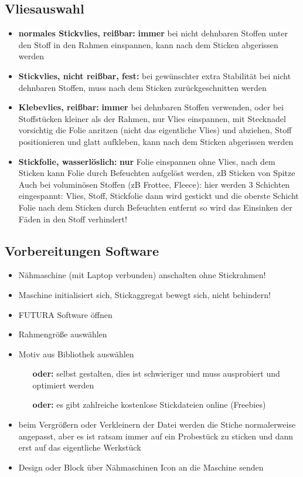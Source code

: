 \documentclass{\basedir/fablab-document}
\begin{document}
\subsection{Vliesauswahl}
\begin{itemize}
 \item \textbf{normales Stickvlies, reißbar:} \textbf{immer} bei nicht dehnbaren Stoffen unter den Stoff in den Rahmen einspannen, kann nach dem Sticken abgerissen werden
 \item \textbf{Stickvlies, nicht reißbar, fest:} bei gewünschter extra Stabilität bei nicht dehnbaren Stoffen, muss nach dem Sticken zurückgeschnitten werden
 \item \textbf{Klebevlies, reißbar:} \textbf{immer} bei dehnbaren Stoffen verwenden, oder bei Stoffstücken kleiner als der Rahmen, nur Vlies einspannen, mit Stecknadel vorsichtig die Folie anritzen (nicht das eigentliche Vlies) und abziehen, Stoff positionieren und glatt aufkleben, kann nach dem Sticken abgerissen werden
 \item \textbf{Stickfolie, wasserlöslich:} \textbf{nur} Folie einspannen ohne Vlies, nach dem Sticken kann Folie durch Befeuchten aufgelöst werden, zB Sticken von Spitze
Auch bei voluminösen Stoffen (zB Frottee, Fleece): hier werden 3 Schichten eingespannt: Vlies, Stoff, Stickfolie dann wird gestickt und die oberste Schicht Folie nach dem Sticken durch Befeuchten entfernt
so wird das Einsinken der Fäden in den Stoff verhindert!
\end{itemize}

\subsection{Vorbereitungen Software}
\begin{itemize}
 \item Nähmaschine (mit Laptop verbunden) anschalten ohne Stickrahmen!
 \item Maschine initialisiert sich, Stickaggregat bewegt sich, nicht behindern!
 \item FUTURA Software öffnen
 \item Rahmengröße auswählen
 \item Motiv aus Bibliothek auswählen
 \begin{itemize}
	\item[\textbf{oder:}] selbst gestalten, dies ist schwieriger und muss ausprobiert und optimiert 
werden
	\item[\textbf{oder:}] es gibt zahlreiche kostenlose Stickdateien online (Freebies)
 \end{itemize}
 \item beim Vergrößern oder Verkleinern der Datei werden die Stiche normalerweise angepasst, aber es ist ratsam immer auf ein Probestück zu sticken und dann erst auf das eigentliche Werkstück
 \item Design oder Block über Nähmaschinen Icon an die Maschine senden
\end{itemize}
\end{document}

